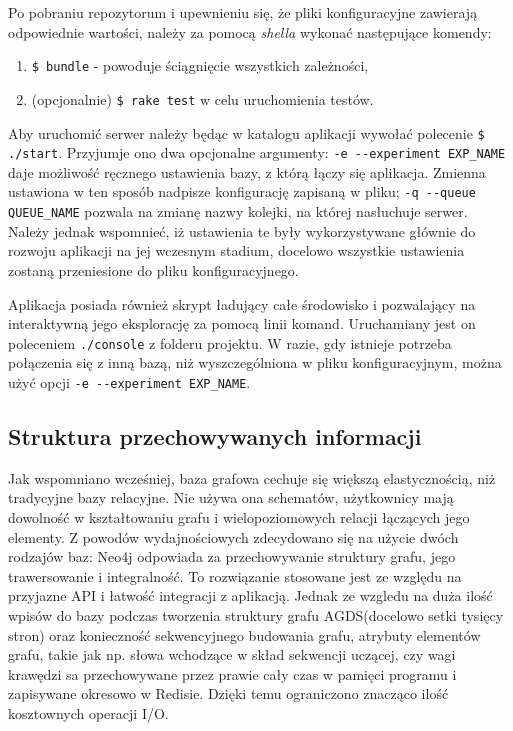 Po pobraniu repozytorum i upewnieniu się, że pliki konfiguracyjne zawierają odpowiednie wartości, należy za pomocą \emph{shella} wykonać następujące komendy:
\begin{enumerate}
\item \texttt{\$ bundle} - powoduje ściągnięcie wszystkich zależności,
\item (opcjonalnie) \texttt{\$ rake test} w celu uruchomienia testów.
\end{enumerate}

Aby uruchomić serwer należy będąc w katalogu aplikacji wywołać polecenie \texttt{\$ ./start}. Przyjumje ono dwa opcjonalne argumenty: \texttt{-e -\--experiment EXP\_NAME} daje możliwość
ręcznego ustawienia bazy, z którą łączy się aplikacja. Zmienna ustawiona w ten sposób nadpisze konfigurację zapisaną w pliku; \texttt{-q -\--queue QUEUE\_NAME} pozwala na zmianę nazwy
kolejki, na której nasłuchuje serwer. Należy jednak wspomnieć, iż ustawienia te były wykorzystywane głównie do rozwoju aplikacji na jej wczesnym stadium, docelowo wszystkie ustawienia
zostaną przeniesione do pliku konfiguracyjnego.

Aplikacja posiada również skrypt ładujący całe środowisko i pozwalający na interaktywną jego eksplorację za pomocą linii komand. Uruchamiany jest on poleceniem \texttt{./console} z
folderu projektu. W razie, gdy istnieje potrzeba połączenia się z inną bazą, niż wyszczególniona w pliku konfiguracyjnym, można użyć opcji \texttt{-e -\--experiment EXP\_NAME}.

\subsection{Struktura przechowywanych informacji}
\label{subs:struktNeo4j}

Jak wspomniano wcześniej, baza grafowa cechuje się większą elastycznością, niż tradycyjne bazy relacyjne. Nie używa ona schematów, użytkownicy mają dowolność w kształtowaniu 
grafu i wielopoziomowych relacji łączących jego elementy. Z powodów wydajnościowych zdecydowano się na użycie dwóch rodzajów baz: Neo4j odpowiada za przechowywanie struktury grafu,
jego trawersowanie i integralność. To rozwiązanie stosowane jest ze względu na przyjazne API i łatwość integracji z aplikacją. Jednak ze wzgledu na duża ilość wpisów do bazy
podczas tworzenia struktury grafu AGDS(docelowo setki tysięcy stron) oraz konieczność sekwencyjnego budowania grafu, atrybuty elementów grafu, takie jak np. słowa wchodzące
w skład sekwencji uczącej, czy wagi krawędzi sa przechowywane przez prawie cały czas w pamięci programu i zapisywane okresowo w Redisie. Dzięki temu ograniczono znacząco ilość
kosztownych operacji I/O.

